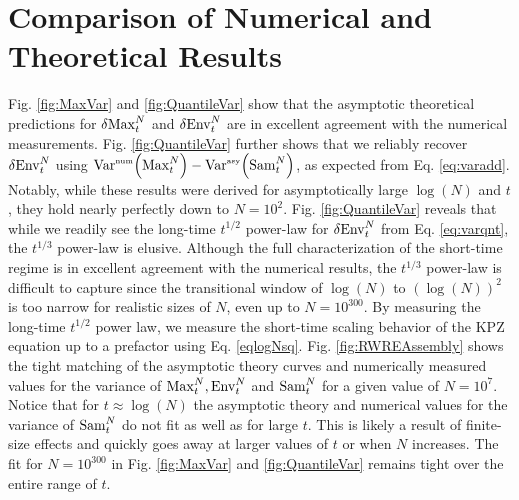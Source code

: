 \section{Comparison of Numerical and Theoretical Results}
Fig. \ref{fig:MaxVar} and \ref{fig:QuantileVar} show that the asymptotic theoretical predictions for $\var{\mathrm{Max}^{N}_t}$ and $\var{\mathrm{Env}^{N}_t}$ are in excellent agreement with the numerical measurements.  Fig. \ref{fig:QuantileVar} further shows that we reliably recover $\var{\mathrm{Env}^{N}_t}$ using $\mathrm{Var}^{\textrm{\tiny{num}}}\!\left(\mathrm{Max}^{N}_t\right) - \mathrm{Var}^{\textrm{\tiny{asy}}}\!\left(\mathrm{Sam}^{N}_t\right)$, as expected from Eq. \ref{eq:varadd}. Notably, while these results were derived for asymptotically large $\log(N)$ and $t$, they hold nearly perfectly down to $N=10^{2}$.
Fig. \ref{fig:QuantileVar} reveals that while we readily see the long-time $t^{1/2}$ power-law for $\var{\mathrm{Env}^{N}_t}$ from Eq. \ref{eq:varqnt}, the $t^{1/3}$ power-law is elusive. Although the full characterization of the short-time regime is in excellent agreement with the numerical results, the $t^{1/3}$ power-law is difficult to capture since the transitional window of $\log(N)$ to $(\log(N))^2$ is too narrow for realistic sizes of $N$, even up to $N=10^{300}$. By measuring the long-time $t^{1/2}$ power law, we measure the short-time scaling behavior of the KPZ equation up to a prefactor using Eq. \ref{eqlogNsq}. Fig. \ref{fig:RWREAssembly} shows the tight matching of the asymptotic theory curves and numerically measured values for the variance of $\mathrm{Max}^{N}_t, \mathrm{Env}^{N}_t$ and $\mathrm{Sam}^{N}_t$ for a given value of $N=10^7$. Notice that for $t\approx \log(N)$ the asymptotic theory and numerical values for the variance of $\mathrm{Sam}^{N}_t$ do not fit as well as for large $t$. This is likely a result of finite-size effects and quickly goes away at larger values of $t$ or when $N$ increases. The fit for $N=10^{300}$ in Fig. \ref{fig:MaxVar} and \ref{fig:QuantileVar} remains tight over the entire range of $t$.


